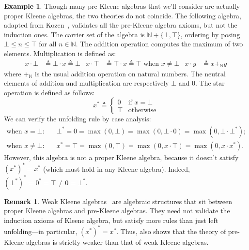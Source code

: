 \documentclass[11pt,a4paper]{amsart}
\theoremstyle{definition}
\newtheorem{example}[theorem]{Example}
\newtheorem{remark}[theorem]{Remark}
\begin{document}
\begin{example}\label{exp:preKA-that-is-not-a-WKA}
  Though many pre-Kleene algebras that we'll consider are actually proper Kleene
  algebras, the two theories do not coincide.  The following algebra, adapted
  from Kozen~\cite{kozen_KleeneAlgebrasClosed_1990}, validates all the
  pre-Kleene algebra axioms, but not the induction ones. The carrier set of the
  algebra is \(\mathbb{N} + \{\bot, \top\}\), ordering by posing
  \( \bot \leq n \leq \top \) for all \(n \in \mathbb{N}\).  The addition
  operation computes the maximum of two elements. Multiplication is defined as:
  \begin{align*}
    x \cdot  \bot  & \triangleq  \bot  \cdot x \triangleq  \bot  &
    x \cdot  \top  & \triangleq  \top  \cdot x \triangleq  \top  \text{ when } x \neq \bot &
    x \cdot y & \triangleq x +_{\mathbb{N}} y
  \end{align*}
  where \(+_{\mathbb{N}}\) is the usual addition operation on natural numbers.
  The neutral elements of addition and multiplication are respectively $\bot$ and \(0\).  
  The star operation is defined as follows:
  \[x^* \triangleq
    \begin{cases}
      0 & \text{if } x = \bot \\
      \top & \text{otherwise}
    \end{cases}
  \]
  We can verify the unfolding rule by case analysis:
  \begin{align*}
    \text{when \(x = \bot\):}
    \quad&
           \bot^*
           = 0
           = \max(0, \bot)
           = \max(0, \bot \cdot 0)
           = \max(0, \bot \cdot \bot^*);\\
    \text{when \(x \neq \bot\):}
    \quad&
           x^*
           = \top
           = \max(0, \top)
           = \max(0, x \cdot \top)
           = \max(0, x \cdot x^*).
  \end{align*}
  However, this algebra is not a proper Kleene algebra, because it doesn't
  satisfy \((x^*)^* = x^*\) (which must hold in any Kleene algebra). Indeed,
  \((\bot^*)^* = 0^* = \top \neq 0 = \bot^*.\)
\end{example}

\begin{remark}
  Weak Kleene algebras~\cite{kozen_LefthandedCompleteness_2020} are algebraic
  structures that sit between proper Kleene algebras and pre-Kleene algebras.
  They need not validate the induction axioms of Kleene algebra, but satisfy
  more rules than just left unfolding---in particular, $(x^*)^* = x^*$.  Thus,
   also shows that the theory of pre-Kleene
  algebras is strictly weaker than that of weak Kleene algebras.
\end{remark}
\end{document}

